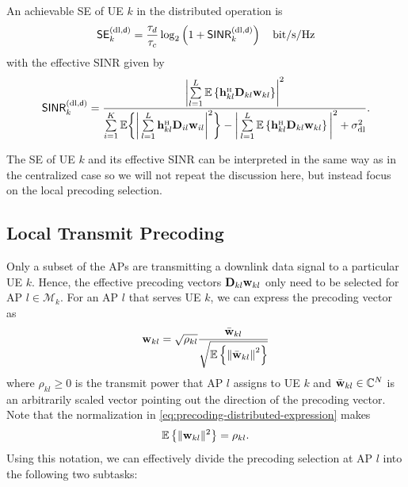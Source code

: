 \begin{corollary} \label{theorem:downlink-capacity-level2}
	An achievable SE of UE $k$ in the distributed operation is
	\begin{equation} \label{eq:downlink-rate-expression-level2}
	\begin{split}
	\mathsf{SE}_{k}^{({\rm dl},\mathsf{d})} = \frac{\tau_d}{\tau_c} \log_2  \left( 1 + \mathsf{SINR}_{k}^{({\rm dl},\mathsf{d})}  \right) \quad \textrm{bit/s/Hz}
	\end{split}
	\end{equation}
	with the effective SINR given by
	\begin{equation} \label{eq:downlink-instant-SINR-level2}
	\mathacr{SINR}_{k}^{({\rm dl},\dist)} =  \frac{ \left|\sum\limits_{l=1}^L  \mathbb{E}\left \{ \vect{h}_{kl}^{\Htran}\vect{D}_{kl}{\vect{w}}_{kl}\right \} \right|^2  }{\sum\limits_{i=1}^{K} \mathbb{E} \bigg\{ \bigg| \sum\limits_{l=1}^{L}  \vect{h}_{kl}^{\Htran} \vect{D}_{il} {\vect{w}}_{il} \bigg|^2 \bigg\} -  \bigg|\sum\limits_{l=1}^L  \mathbb{E} \left\{  \vect{h}_{kl}^{\Htran} \vect{D}_{kl} {\vect{w}}_{kl} \right\} \bigg|^2 +  \sigmaDL
	}.
	\end{equation}
\end{corollary}

The SE of UE $k$ and its effective SINR can be interpreted in the same way as in the centralized case so we will not repeat the discussion here, but instead focus on the local precoding selection.

\subsection{Local Transmit Precoding}
\label{subsec:distributed-precoding}
Only a subset of the APs are transmitting a downlink data signal to a particular UE $k$. Hence, the effective precoding vectors $\mathbf{D}_{kl}\mathbf{w}_{kl}$ only need to be selected for AP $l \in \mathcal{M}_k$.
For an AP $l$ that serves UE $k$, we can express the precoding vector as 
\begin{align} \label{eq:precoding-distributed-expression}
{\mathbf{w}}_{kl}= \sqrt{\rho_{kl}}\frac{\bar{\mathbf{w}}_{kl}}{\sqrt{\mathbb{E}\left\{\left\| \bar{\mathbf{w}}_{kl}\right\|^2\right\}}}
\end{align} 
where $\rho_{kl} \geq 0 $ is the transmit power that AP $l$ assigns to UE $k$ and $\bar{\mathbf{w}}_{kl} \in \mathbb{C}^{N}$ is an arbitrarily scaled vector pointing out the direction of the precoding vector. 
Note that the normalization in \eqref{eq:precoding-distributed-expression} makes 
\begin{equation}
\mathbb{E} \left\{ \| \mathbf{w}_{kl} \|^2 \right\} = \rho_{kl}.
\end{equation}
Using this notation, we can effectively divide the precoding selection at AP $l$ into the following two subtasks: 

